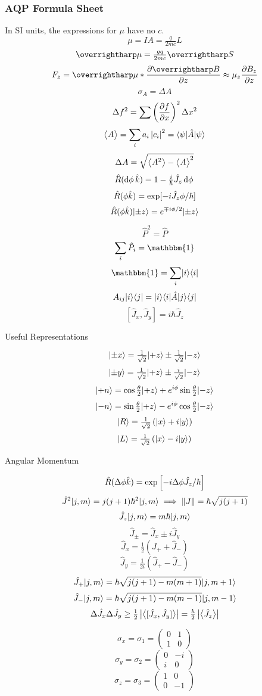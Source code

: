 \documentclass[8pt]{article}
\begin{document}
\subsubsection*{AQP Formula Sheet}
\begin{multicols}{3}
	In SI units, the expressions for \(\mu\) have no \(c\).
	\[\mu=IA=\tfrac{q}{2mc}{L}\]
	\[\vv\mu = \tfrac{gq}{2mc}\vv S\]
	\[F_z = \vv\mu * \pder{\vv B}{z}\approx \mu_z \pder{B_z}{z}\]
	\[\sigma_A = \Delta A\]
	\[\Delta f^2=\sum\left(\frac{\partial f}{\partial x}\right)^2\Delta x^2\]
	\[\left\langle \begin{matrix}A\end{matrix} \right\rangle = \sum_i a_i \left|c_i\right|^2 = \langle\psi\rvert \hat{A} \lvert\psi\rangle\]
	\[\Delta A = \sqrt{\left\langle \begin{matrix}A^2\end{matrix} \right\rangle-\left\langle \begin{matrix}A\end{matrix} \right\rangle^2}\]
	\[\hat{R}(\d{\phi}\kh) = 1-\tfrac{i}{\hbar}\hat{J}_z\d\phi\]
	\[\hat{R}(\phi\hat{k}) = \exp[-i\hat{J}_z\phi/\hbar]\]
	\[\hat{R}(\phi\hat{k})\lvert\pm z\rangle = e^{\mp i\phi/2}\lvert\pm z\rangle\]

	\[\hat P^2 = \hat{P}\]
	\[\sum_i\hat{P}_i = \mathbbm{1}\]
	\[\mathbbm{1}=\sum_i\k{i}\b{i}\]
	\[A_{ij}\lvert i\rangle\langle j\rvert=\lvert i\rangle\langle i\rvert\hat{A}\lvert j\rangle\langle j\rvert\]
	\[[\hat{J}_x, \hat{J}_y] = i\hbar \hat{J}_z\]
\end{multicols}
Useful Representations
\begin{multicols}{3}
	\noindent
	\[\lvert\pm x\rangle = \tfrac{1}{\sqrt{2}}\lvert+z\rangle\pm\tfrac{1}{\sqrt{2}}\lvert-z\rangle\]
	\[\lvert\pm y\rangle = \tfrac{1}{\sqrt{2}}\lvert+z\rangle\pm\tfrac{i}{\sqrt{2}}\lvert-z\rangle\]
	\[\lvert+ n\rangle = \cos\tfrac{\theta}{2}\lvert+z\rangle +e^{i\phi}\sin\tfrac\theta2\lvert-z\rangle\]
	\[\lvert- n\rangle = \sin\tfrac{\theta}{2}\lvert+z\rangle -e^{i\phi}\cos\tfrac\theta2\lvert-z\rangle\]
	\[\lvert R\rangle = \tfrac{1}{\sqrt{2}}\left(\lvert x\rangle+i\lvert y\rangle\right)\]
	\[\lvert L\rangle = \tfrac{1}{\sqrt{2}}\left(\lvert x\rangle-i\lvert y\rangle\right)\]
\end{multicols}
Angular Momentum
\begin{multicols}{3}
	\noindent
	\[\hat{R}(\Delta\phi\hat{k}) = \exp\left[-i\Delta\phi \hat{J}_z/\hbar\right]\]
	\[\hat{J}^2\lvert j,m\rangle = j(j+1) \hbar^2\lvert j,m\rangle\implies\left\lVert J\right\rVert=\hbar\sqrt{j(j+1)}\]
	\[\hat{J}_z\lvert j,m\rangle = m\hbar\lvert j,m\rangle\]
	\[\hat{J}_\pm = \hat{J}_x\pm i\hat{J}{_y}\]
	\[\hat{J}_x=\tfrac{1}{2}\left(\hat{J}_++\hat{J}_-\right)\]
	\[\hat{J}_y=\tfrac{1}{2i}\left(\hat{J}_+-\hat{J}_-\right)\]
	\[\hat{J}_+\lvert j,m\rangle=\hbar\sqrt{j(j+1)-m(m+1)}\lvert j,m+1\rangle\]
	\[\hat{J}_-\lvert j,m\rangle=\hbar\sqrt{j(j+1)-m(m-1)}\lvert j,m-1\rangle\]
	\[\Delta \hat{J}_x\Delta \hat{J}_y\geq\tfrac{1}{2}\left|\left\langle \begin{matrix}[\hat{J}_x,\hat{J}_y]\end{matrix} \right\rangle\right|=\tfrac{\hbar}{2}\left|\left\langle \begin{matrix}\hat{J}_z\end{matrix} \right\rangle\right|\]
\end{multicols}
\begin{multicols}{3}
	\noindent
	\[\sigma_x=\sigma_1= \begin{pmatrix}
		0 & 1 \\ 1 & 0
	\end{pmatrix}\]
	\[\sigma_y=\sigma_2= \begin{pmatrix}
		0 & -i \\ i & 0
	\end{pmatrix}\]
	\[\sigma_z=\sigma_3= \begin{pmatrix}
		1 & 0 \\ 0 & -1
	\end{pmatrix}\]
\end{multicols}
\end{document}
